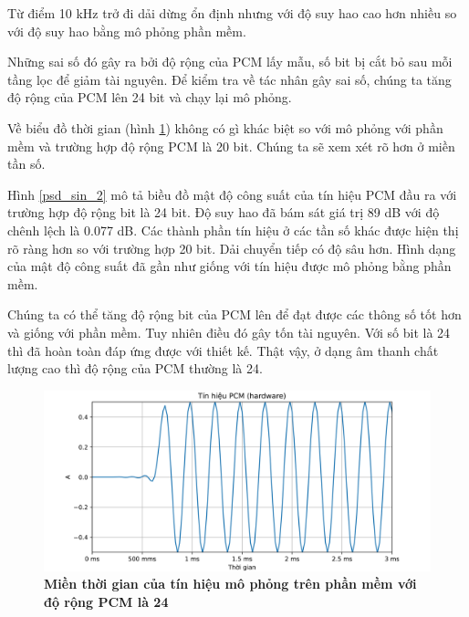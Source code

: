 Từ điểm 10 kHz trở đi dải dừng ổn định nhưng với độ suy hao cao hơn nhiều so với độ suy hao bằng mô phỏng phần mềm.

Những sai số đó gây ra bởi độ rộng của PCM lấy mẫu, số bit bị cắt bỏ sau mỗi tầng lọc để giảm tài nguyên. Để kiểm tra về tác nhân gây sai số, chúng ta tăng độ rộng của PCM lên 24 bit và chạy lại mô phỏng.

Về biểu đồ thời gian (hình \ref{sin_2}) không có gì khác biệt so với mô phỏng với phần mềm và trường hợp độ rộng PCM là 20 bit. Chúng ta sẽ xem xét rõ hơn ở miền tần số.

Hình \ref{psd_sin_2} mô tả biều đồ mật độ công suất của tín hiệu PCM đầu ra với trường hợp độ rộng bit là 24 bit. Độ suy hao đã bám sát giá trị 89 dB với độ chênh lệch là 0.077 dB. Các thành phần tín hiệu ở các tần số khác được hiện thị rõ ràng hơn so với trường hợp 20 bit. Dải chuyển tiếp có độ sâu hơn. Hình dạng của mật độ công suất đã gần như giống với tín hiệu được mô phỏng bằng phần mềm.

Chúng ta có thể tăng độ rộng bit của PCM lên để đạt được các thông số tốt hơn và giống với phần mềm. Tuy nhiên điều đó gây tốn tài nguyên. Với số bit là 24 thì đã hoàn toàn đáp ứng được với thiết kế. Thật vậy, ở dạng âm thanh chất lượng cao thì độ rộng của PCM thường là 24.

\begin{figure}[H]
    \centering
    \includegraphics[width=14cm]{Images/Chuong4/tb/sim/sin_2.png}
    \caption[Miền thời gian của tín hiệu mô phỏng trên phần mềm với độ rộng PCM là 24]{\bfseries \fontsize{12pt}{0pt}\selectfont  Miền thời gian của tín hiệu mô phỏng trên phần mềm với độ rộng PCM là 24}
    \label{sin_2}
\end{figure}


